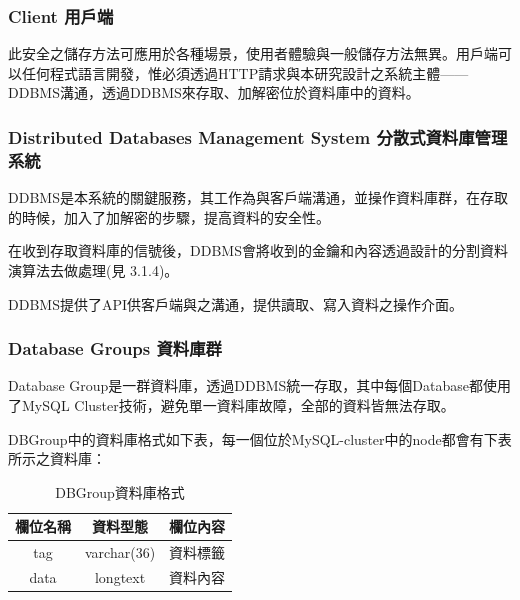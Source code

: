 \documentclass[11pt,twocolumn]{article}
\begin{document}
\subsubsection{Client 用戶端}
此安全之儲存方法可應用於各種場景，使用者體驗與一般儲存方法無異。用戶端可以任何程式語言開發，惟必須透過HTTP請求與本研究設計之系統主體——DDBMS溝通，透過DDBMS來存取、加解密位於資料庫中的資料。\par

\subsubsection{Distributed Databases Management System 分散式資料庫管理系統}

DDBMS是本系統的關鍵服務，其工作為與客戶端溝通，並操作資料庫群，在存取的時候，加入了加解密的步驟，提高資料的安全性。\par
在收到存取資料庫的信號後，DDBMS會將收到的金鑰和內容透過設計的分割資料演算法去做處理(見 3.1.4)。\par
DDBMS提供了API供客戶端與之溝通，提供讀取、寫入資料之操作介面。\par
\subsubsection{Database Groups 資料庫群}
Database Group是一群資料庫，透過DDBMS統一存取，其中每個Database都使用了MySQL Cluster技術，避免單一資料庫故障，全部的資料皆無法存取。\par
DBGroup中的資料庫格式如下表，每一個位於MySQL-cluster中的node都會有下表所示之資料庫：\par

\begin{table}[h]
    \centering
    \begin{tabular}{ |c|c|c| }
     欄位名稱 & 資料型態 & 欄位內容 \\
     \hline
     tag & varchar(36) & 資料標籤 \\ 
     data & longtext & 資料內容
    \end{tabular}
    \caption{DBGroup資料庫格式}
\end{table}
\end{document}
